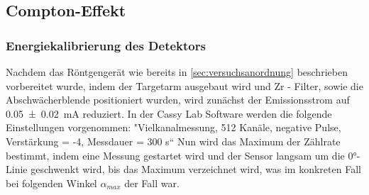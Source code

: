 \documentclass[12pt,english,ngerman]{scrartcl}
\begin{document}
\begin{figure}[H]
	\centering
	 \hfill
\end{figure}

\subsection{Compton-Effekt}

\subsubsection{Energiekalibrierung des Detektors}

Nachdem das Röntgengerät wie bereits in \autoref{sec:versuchsanordnung} beschrieben vorbereitet wurde, indem
der Targetarm ausgebaut wird und Zr - Filter, sowie die Abschwächerblende positioniert wurden, wird zunächst der
Emissionsstrom auf \SI{0.05(2)}{mA} reduziert.
In der Cassy Lab Software werden die folgende Einstellungen vorgenommen: 
"Vielkanalmessung, 512 Kanäle, negative Pulse, Verstärkung = -4, Messdauer = 300 s“
Nun wird das Maximum der Zählrate bestimmt, indem eine Messung gestartet wird und der Sensor langsam um 
die 0°-Linie geschwenkt wird, bis das Maximum verzeichnet wird, was im konkreten Fall bei folgenden Winkel 
$\alpha_{max}$ der Fall war.
\end{document}
